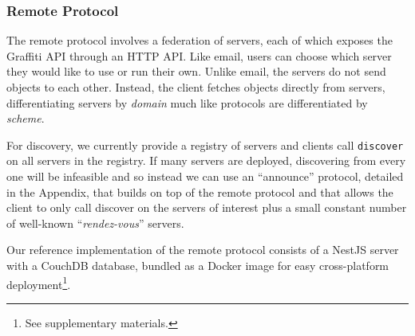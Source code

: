 
\subsubsection{Remote Protocol}
\label{above-and-below:remote-protocol}

The remote protocol involves a federation of servers,
each of which exposes the Graffiti API through an HTTP API.
Like email, users can choose which server they would
like to use or run their own.
Unlike email, the servers do not send objects to each other.
Instead, the client fetches objects directly from servers,
differentiating servers by \emph{domain} much like
protocols are differentiated by \emph{scheme}.

For discovery, we currently provide a registry of servers
and clients call \texttt{discover} on all servers in the registry.
If many servers are deployed, discovering from every one
will be infeasible and so instead we can use an ``announce''
protocol, detailed in the Appendix, that builds on top of the remote protocol and
that allows the client to only call discover on the servers
of interest
plus a small constant number of well-known
``\emph{rendez-vous}'' servers.

Our reference implementation of the remote protocol
consists of a NestJS server with a CouchDB database,
bundled as a Docker image for easy cross-platform
deployment\footnote{
See supplementary materials.
}.



